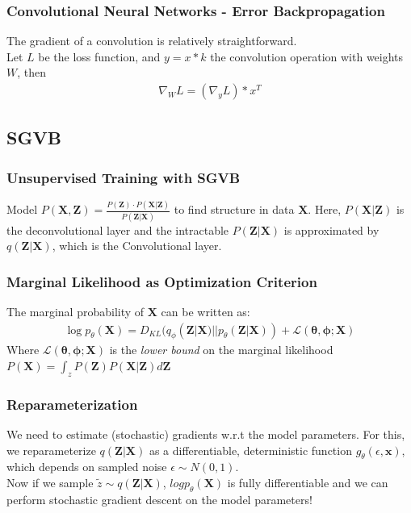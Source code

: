 \documentclass{beamer}
\begin{document}
\begin{frame}
\frametitle{Convolutional Neural Networks - Error Backpropagation}
The gradient of a convolution is relatively straightforward.\\ Let $L$ be the loss function, and $y = x * k$ the convolution operation with weights $W$, then \\   

\begin{align*}
\nabla_W L = (\nabla_y L) * x^T 
\end{align*}

\end{frame}



\subsection{SGVB}
\begin{frame}
\frametitle{Unsupervised Training with SGVB}
Model $P(\mathbf{X},\mathbf{Z}) = \frac{P(\mathbf{Z})\cdot P(\mathbf{X}|\mathbf{Z})}{P(\mathbf{Z}|\mathbf{X})}$ to find structure in data $\mathbf{X}$. \vspace{0.5mm}
Here, $P(\mathbf{X}|\mathbf{Z})$ is the deconvolutional layer and the intractable $P(\mathbf{Z}|\mathbf{X})$ is approximated by $q(\mathbf{Z}|\mathbf{X})$, which is the Convolutional layer.

\end{frame}

\begin{frame}
\frametitle{Marginal Likelihood as Optimization Criterion}
The marginal probability of $\mathbf{X}$ can be written as:
\begin{align*}
\log p_\theta(\mathbf{X}) = D_{KL}(q_\phi(\mathbf{Z}|\mathbf{X}) || p_\theta(\mathbf{Z}|\mathbf{X})) + \mathcal{L}(\mathbf{\theta}, \mathbf{\phi}; \mathbf{X})
\end{align*}
Where 
$\mathcal{L}(\mathbf{\theta}, \mathbf{\phi}; \mathbf{X})$
is the \textit{lower bound} on the marginal likelihood
$
P(\mathbf{X}) = \int_z P(\mathbf{Z})P(\mathbf{X}|\mathbf{Z})d\mathbf{Z}$
\end{frame}

\begin{frame}
\frametitle{Reparameterization}
We need to estimate (stochastic) gradients w.r.t the model parameters. For this, we reparameterize $q(\mathbf{Z}|\mathbf{X})$ as a differentiable, deterministic function $g_{\theta}(\epsilon,\mathbf{x})$, which depends on sampled noise $\epsilon \sim N(0,1)$. \\ Now if we sample $\tilde{z} \sim q(\mathbf{Z}|\mathbf{X})$, $logp_{\theta}(\mathbf{X})$ is fully differentiable and we can perform stochastic gradient descent on the model parameters!
\end{frame}
\end{document}
